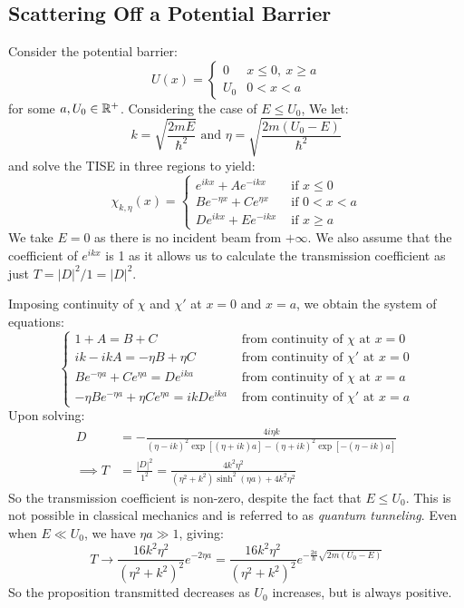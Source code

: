 \documentclass[../main.tex]{subfiles}
\begin{document}
\subsection{Scattering Off a Potential Barrier}
Consider the potential barrier:
\[
  U(x) = \begin{cases}
  0 & x \leq 0,\ x \geq a \\
  U_0 & 0 < x < a
  \end{cases}
\]
for some $a, U_0 \in \mathbb{R}^{+}$.
Considering the case of $E \leq U_0$, We let:
\[
  k = \sqrt{\frac{2mE}{\hbar^2}} \text{ and } \eta = \sqrt{\frac{2m(U_0 - E)}{\hbar^2}}
\]
and solve the TISE in three regions to yield:
\[
  \chi_{k, \eta}(x) = \begin{cases}
  e^{ikx} + Ae^{-ikx} & \text{ if } x \leq 0 \\
  Be^{-\eta x} + Ce^{\eta x} & \text{ if } 0 < x < a \\
  De^{ikx} + Ee^{-ikx} & \text{ if } x \geq a
  \end{cases}
\]
We take $E = 0$ as there is no incident beam from $+\infty$.
We also assume that the coefficient of $e^{ikx}$ is 1 as it allows us to calculate the transmission coefficient as just $T = |D|^2/1 = |D|^2$.

Imposing continuity of $\chi$ and $\chi'$ at $x = 0$ and $x = a$, we obtain the system of equations:
\[
  \begin{cases}
  1 + A = B + C & \text{ from continuity of $\chi$ at $x = 0$} \\
  ik - ikA = -\eta B + \eta C & \text{ from continuity of $\chi'$ at $x = 0$} \\
  Be^{-\eta a} + Ce^{\eta a} = D e^{ika} & \text{ from continuity of $\chi$ at $x = a$} \\
  -\eta B e^{-\eta a} + \eta C e^{\eta a} = ik De^{ika} & \text{ from continuity of $\chi'$ at $x = a$}
  \end{cases}
\]
Upon solving:
\begin{align*}
  D &= - \frac{4i\eta k}{(\eta - ik)^2 \exp[(\eta + ik)a] - (\eta + ik)^2 \exp[-(\eta - ik)a]} \\
  \implies T &= \frac{|D|^2}{1^2} = \frac{4k^2 \eta^2}{(\eta^2 + k^2) \sinh^2(\eta a) + 4k^2 \eta^2}
\end{align*}
So the transmission coefficient is non-zero, despite the fact that $E \leq U_0$.
This is not possible in classical mechanics and is referred to as \textit{quantum tunneling}.
Even when $E \ll U_0$, we have $\eta a \gg 1$, giving:
\[
  T \to \frac{16 k^2 \eta^2}{(\eta^2 + k^2)^2} e^{-2\eta a} = \frac{16 k^2 \eta^2}{(\eta^2 + k^2)^2} e^{-\frac{2a}{\hbar}\sqrt{2m(U_0 - E)}}
\]
So the proposition transmitted decreases as $U_0$ increases, but is always positive.
\end{document}
